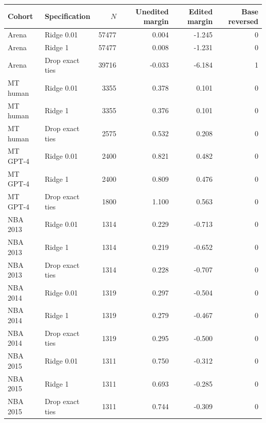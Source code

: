 \begin{tabular}{llrrrr}
\toprule
Cohort & Specification & $N$ & Unedited margin & Edited margin & Base reversed \\
\midrule
Arena & Ridge 0.01 & 57477 & 0.004 & -1.245 & 0 \\
Arena & Ridge 1 & 57477 & 0.008 & -1.231 & 0 \\
Arena & Drop exact ties & 39716 & -0.033 & -6.184 & 1 \\
MT human & Ridge 0.01 & 3355 & 0.378 & 0.101 & 0 \\
MT human & Ridge 1 & 3355 & 0.376 & 0.101 & 0 \\
MT human & Drop exact ties & 2575 & 0.532 & 0.208 & 0 \\
MT GPT-4 & Ridge 0.01 & 2400 & 0.821 & 0.482 & 0 \\
MT GPT-4 & Ridge 1 & 2400 & 0.809 & 0.476 & 0 \\
MT GPT-4 & Drop exact ties & 1800 & 1.100 & 0.563 & 0 \\
NBA 2013 & Ridge 0.01 & 1314 & 0.229 & -0.713 & 0 \\
NBA 2013 & Ridge 1 & 1314 & 0.219 & -0.652 & 0 \\
NBA 2013 & Drop exact ties & 1314 & 0.228 & -0.707 & 0 \\
NBA 2014 & Ridge 0.01 & 1319 & 0.297 & -0.504 & 0 \\
NBA 2014 & Ridge 1 & 1319 & 0.279 & -0.467 & 0 \\
NBA 2014 & Drop exact ties & 1319 & 0.295 & -0.500 & 0 \\
NBA 2015 & Ridge 0.01 & 1311 & 0.750 & -0.312 & 0 \\
NBA 2015 & Ridge 1 & 1311 & 0.693 & -0.285 & 0 \\
NBA 2015 & Drop exact ties & 1311 & 0.744 & -0.309 & 0 \\
\bottomrule
\end{tabular}
